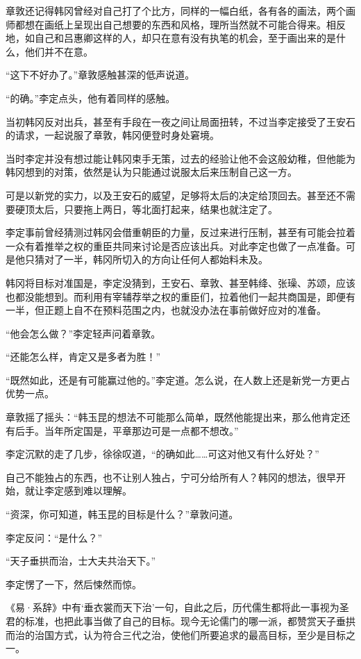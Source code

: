 章敦还记得韩冈曾经对自己打了个比方，同样的一幅白纸，各有各的画法，两个画师都想在画纸上呈现出自己想要的东西和风格，理所当然就不可能合得来。相反地，如自己和吕惠卿这样的人，却只在意有没有执笔的机会，至于画出来的是什么，他们并不在意。

“这下不好办了。”章敦感触甚深的低声说道。

“的确。”李定点头，他有着同样的感触。

当初韩冈反对出兵，甚至有手段在一夜之间让局面扭转，不过当李定接受了王安石的请求，一起说服了章敦，韩冈便登时身处窘境。

当时李定并没有想过能让韩冈束手无策，过去的经验让他不会这般幼稚，但他能为韩冈想到的对策，依然是认为只能通过说服太后来压制自己这一方。

可是以新党的实力，以及王安石的威望，足够将太后的决定给顶回去。甚至还不需要硬顶太后，只要拖上两日，等北面打起来，结果也就注定了。

李定事前曾经猜测过韩冈会借重朝臣的力量，反过来进行压制，甚至有可能会拉着一众有着推举之权的重臣共同来讨论是否应该出兵。对此李定也做了一点准备。可是他只猜对了一半，韩冈所切入的方向让任何人都始料未及。

韩冈将目标对准国是，李定没猜到，王安石、章敦、甚至韩绛、张璪、苏颂，应该也都没能想到。而利用有宰辅荐举之权的重臣们，拉着他们一起共商国是，即便有一半，但正题上自不在预料范围之内，也就没办法在事前做好应对的准备。

“他会怎么做？”李定轻声问着章敦。

“还能怎么样，肯定又是多者为胜！”

“既然如此，还是有可能赢过他的。”李定道。怎么说，在人数上还是新党一方更占优势一点。

章敦摇了摇头：“韩玉昆的想法不可能那么简单，既然他能提出来，那么他肯定还有后手。当年所定国是，平章那边可是一点都不想改。”

李定沉默的走了几步，徐徐叹道，“的确如此……可这对他又有什么好处？”

自己不能独占的东西，也不让别人独占，宁可分给所有人？韩冈的想法，很早开始，就让李定感到难以理解。

“资深，你可知道，韩玉昆的目标是什么？”章敦问道。

李定反问：“是什么？”

“天子垂拱而治，士大夫共治天下。”

李定愣了一下，然后悚然而惊。

《易·系辞》中有‘垂衣裳而天下治’一句，自此之后，历代儒生都将此一事视为圣君的标准，也把此事当做了自己的目标。现今无论儒门的哪一派，都赞赏天子垂拱而治的治国方式，认为符合三代之治，使他们所要追求的最高目标，至少是目标之一。

